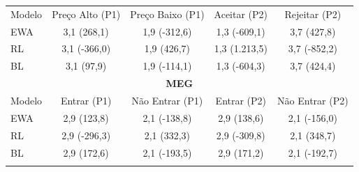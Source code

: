 \begin{tabela}[H]
\small
\centering
\caption{Frequências esperadas e resíduos padronizados do teste $\chi^2$ nos jogos BSG e MEG}
\begin{tabular}{l|c c c c}
\Xhline{2\arrayrulewidth}
\multicolumn{5}{c}{\textbf{BSG}} \\ \hline
Modelo & Preço Alto (P1) & Preço Baixo (P1) & Aceitar (P2) & Rejeitar (P2) \\ \hline
EWA & 3,1 (268,1) & 1,9 (-312,6) & 1,3 (-609,1) & 3,7 (427,8) \\
RL & 3,1 (-366,0) & 1,9 (426,7) & 1,3 (1.213,5) & 3,7 (-852,2) \\
BL & 3,1 (97,9) & 1,9 (-114,1) & 1,3 (-604,3) & 3,7 (424,4) \\ 
\hline
\multicolumn{5}{c}{\textbf{MEG}} \\ \hline
Modelo & Entrar (P1) & Não Entrar (P1) & Entrar (P2) & Não Entrar (P2) \\ \hline
EWA & 2,9 (123,8) & 2,1 (-138,8) & 2,9 (138,6) & 2,1 (-156,0) \\
RL & 2,9 (-296,3) & 2,1 (332,3) & 2,9 (-309,8) & 2,1 (348,7) \\
BL & 2,9 (172,6) & 2,1 (-193,5) & 2,9 (171,2) & 2,1 (-192,7) \\ 
\Xhline{2\arrayrulewidth}
\end{tabular}
\label{tabela_10}
\caption*{\fontsize{10}{12}\selectfont Fonte: Elaborado pelo autor (2024).}
\end{tabela}

